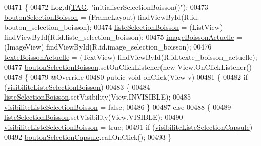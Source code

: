\begin{DoxyCode}
00471     \{
00472         Log.d(\hyperlink{classcom_1_1example_1_1ekawa_1_1_ihm_a95cd92c2acaf9f8982302da08d94f9aa}{TAG}, \textcolor{stringliteral}{"initialiserSelectionBoisson()"});
00473         \hyperlink{classcom_1_1example_1_1ekawa_1_1_ihm_a5aec848e98e7bd8b933b87e390de809e}{boutonSelectionBoisson} = (FrameLayout) findViewById(R.id.
      bouton\_selection\_boisson);
00474         \hyperlink{classcom_1_1example_1_1ekawa_1_1_ihm_a6f81eeec5d65c16e33b7ac67b4e771cb}{listeSelectionBoisson} = (ListView) findViewById(R.id.liste\_selection\_boisson);
00475         \hyperlink{classcom_1_1example_1_1ekawa_1_1_ihm_a2d83809a52b5f9a97f7817ae183c456d}{imageBoissonActuelle} = (ImageView) findViewById(R.id.image\_selection\_boisson);
00476         \hyperlink{classcom_1_1example_1_1ekawa_1_1_ihm_a6655fee013d48228f2c7981f1cd8f74e}{texteBoissonActuelle} = (TextView) findViewById(R.id.texte\_boisson\_actuelle);
00477         \hyperlink{classcom_1_1example_1_1ekawa_1_1_ihm_a5aec848e98e7bd8b933b87e390de809e}{boutonSelectionBoisson}.setOnClickListener(\textcolor{keyword}{new} View.OnClickListener()
00478         \{
00479             @Override
00480             \textcolor{keyword}{public} \textcolor{keywordtype}{void} onClick(View v)
00481             \{
00482                 \textcolor{keywordflow}{if} (\hyperlink{classcom_1_1example_1_1ekawa_1_1_ihm_a874a157d2a92d1a386a06512f36182ff}{visibiliteListeSelectionBoisson})
00483                 \{
00484                     \hyperlink{classcom_1_1example_1_1ekawa_1_1_ihm_a6f81eeec5d65c16e33b7ac67b4e771cb}{listeSelectionBoisson}.setVisibility(View.INVISIBLE);
00485                     \hyperlink{classcom_1_1example_1_1ekawa_1_1_ihm_a874a157d2a92d1a386a06512f36182ff}{visibiliteListeSelectionBoisson} = \textcolor{keyword}{false};
00486                 \}
00487                 \textcolor{keywordflow}{else}
00488                 \{
00489                     \hyperlink{classcom_1_1example_1_1ekawa_1_1_ihm_a6f81eeec5d65c16e33b7ac67b4e771cb}{listeSelectionBoisson}.setVisibility(View.VISIBLE);
00490                     \hyperlink{classcom_1_1example_1_1ekawa_1_1_ihm_a874a157d2a92d1a386a06512f36182ff}{visibiliteListeSelectionBoisson} = \textcolor{keyword}{true};
00491                     \textcolor{keywordflow}{if} (\hyperlink{classcom_1_1example_1_1ekawa_1_1_ihm_aa6b9cda83ef1aba8816fd43797fb7ab2}{visibiliteListeSelectionCapsule})
00492                         \hyperlink{classcom_1_1example_1_1ekawa_1_1_ihm_a866bc916203a767c5f9def913b59175d}{boutonSelectionCapsule}.callOnClick();
00493                 \}

\end{DoxyCode}
